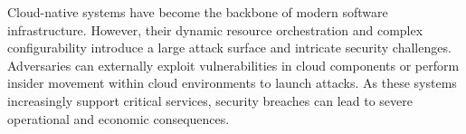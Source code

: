 Cloud-native systems have become the backbone of modern software infrastructure. However, their dynamic resource orchestration and complex configurability introduce a large attack surface and intricate security challenges. Adversaries can externally exploit vulnerabilities in cloud components or perform insider movement within cloud environments to launch attacks. As these systems increasingly support critical services, security breaches can lead to severe operational and economic consequences.